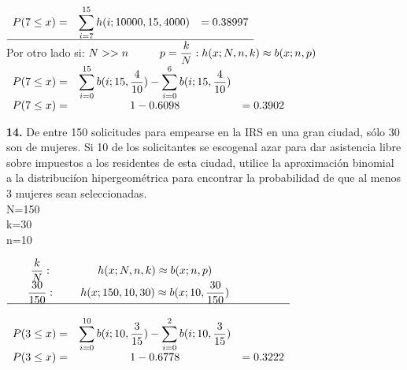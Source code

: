 \documentclass[12pt, letterpaper]{article}
\begin{document}
\begin{center}
\begin{math}
\begin{array}{ccc}
                P(7\leq x)=&\displaystyle\sum^{15}_{i=7} h(i;10000,15,4000)&=0.38997\\
                \hline
                \end{array}
        \end{math}\\
        Por otro lado si: $N>>n \hspace{1 cm}   p = \displaystyle\frac{k}{N} :  h(x;N,n,k) \approx b(x;n,p)$\\
        \begin{math}
            \begin{array}{c c c}
                P(7\leq x)=&\displaystyle\sum^{15}_{i=0} b(i;15,\displaystyle\frac{4}{10})- \displaystyle\sum^{6}_{i=0} b(i;15,\displaystyle\frac{4}{10})&\\
                P(7\leq x)=&1-0.6098&= 0.3902\\   
            \end{array}
        \end{math}
    \end{center}
    \textbf{14.} De entre 150 solicitudes para empearse en la IRS en una gran ciudad, s\'olo 30 son de mujeres. Si 10 de los solicitantes se escogenal azar para dar asistencia libre sobre impuestos a los residentes de esta ciudad, utilice la aproximaci\'on binomial a la distribuci\'ion hipergeom\'etrica para encontrar la probabilidad de que al menos 3 mujeres sean seleccionadas.\\
    N=150\\
    k=30\\
    n=10\\
    \begin{center}
        \begin{math}
            \begin{array}{ccc}
                \displaystyle\frac{k}{N} :&  h(x;N,n,k) \approx b(x;n,p)&\\
                \displaystyle\frac{30}{150} :&  h(x;150,10,30) \approx b(x;10,\displaystyle\frac{30}{150})&\\
                \hline\\
                P(3\leq x)=&\displaystyle\sum^{10}_{i=0} b(i;10,\displaystyle\frac{3}{15})- \displaystyle\sum^{2}_{i=0} b(i;10,\displaystyle\frac{3}{15})&\\
                P(3 \leq x)=& 1-0.6778&=0.3222\\
            \end{array}
        \end{math}
    \end{center}\vskip1cm
\end{document}
